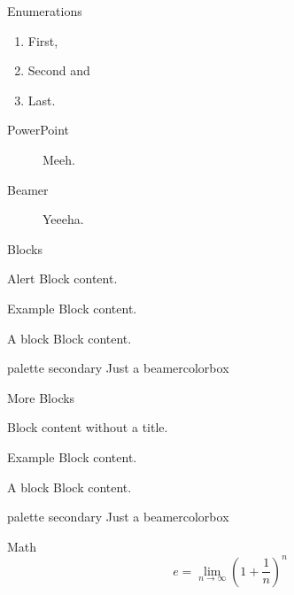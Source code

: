 \documentclass[12pt, dutch]{beamer}
\begin{document}
\begin{frame}{Enumerations}
      \begin{enumerate}
        \item First, \item Second and \item Last.
      \end{enumerate}
       \begin{description}
        \item[PowerPoint] Meeh. \item[Beamer] Yeeeha.
      \end{description}
\end{frame}

\begin{frame}{Blocks}
    \begin{alertblock}{Alert}
        Block content.
      \end{alertblock}
      \begin{exampleblock}{Example}
        Block content.
       \end{exampleblock} 
      \begin{block}{A block}
        Block content.
       \end{block}        
\begin{beamercolorbox}[wd=\linewidth, ht=2.5ex, dp=1.125ex,center]{palette secondary}
Just a beamercolorbox 
\end{beamercolorbox}
           
\end{frame}

\begin{frame}{More Blocks}
    \begin{alertblock}{}
        Block content without a title.
      \end{alertblock}
      \begin{exampleblock}{Example}
        Block content.
       \end{exampleblock} 
      \begin{block}{A block}
        Block content.
       \end{block}        
\begin{beamercolorbox}[wd=\linewidth, ht=2.5ex, dp=1.125ex,center]{palette secondary}
Just a beamercolorbox 
\end{beamercolorbox}
           
\end{frame}

\begin{frame}{Math}
  \begin{equation*}
    e = \lim_{n\to \infty} \left(1 + \frac{1}{n}\right)^n
  \end{equation*}
\end{frame}
\end{document}
